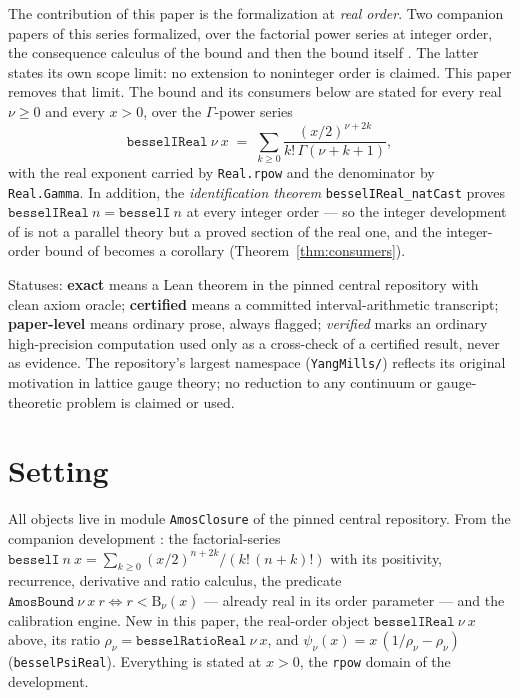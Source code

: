 \documentclass[11pt]{article}
\newcommand{\lean}[1]{\texttt{#1}}
\newcommand{\RHS}{\mathrm{B}}
\begin{document}
The contribution of this paper is the formalization at
\emph{real order}.  Two companion papers of this series formalized,
over the factorial power series at integer order, the consequence
calculus of the bound \cite{ErikssonC2} and then the bound itself
\cite{ErikssonC3}.  The latter states its own scope limit: no
extension to noninteger order is claimed.  This paper removes that
limit.  The bound and its consumers below are stated for every real
$\nu \ge 0$ and every $x > 0$, over the $\Gamma$-power series
\[
\lean{besselIReal}\ \nu\ x \;=\;
\sum_{k \ge 0} \frac{(x/2)^{\nu+2k}}{k!\,\Gamma(\nu+k+1)},
\]
with the real exponent carried by \lean{Real.rpow} and the
denominator by \lean{Real.Gamma}.  In addition, the
\emph{identification theorem} \lean{besselIReal\_natCast} proves
$\lean{besselIReal}\ n = \lean{besselI}\ n$ at every integer order
--- so the integer development of \cite{ErikssonC2,ErikssonC3} is
not a parallel theory but a proved section of the real one, and the
integer-order bound of \cite{ErikssonC3} becomes a corollary
(Theorem~\ref{thm:consumers}).

Statuses: \textbf{exact} means a Lean theorem in the pinned central
repository with clean axiom oracle; \textbf{certified} means a
committed interval-arithmetic transcript; \textbf{paper-level} means
ordinary prose, always flagged; \emph{verified} marks an ordinary
high-precision computation used only as a cross-check of a certified
result, never as evidence.  The repository's largest namespace
(\lean{YangMills/}) reflects its original motivation in lattice
gauge theory; no reduction to any continuum or gauge-theoretic
problem is claimed or used.

\section{Setting}\label{sec:setting}

All objects live in module \lean{AmosClosure} of the pinned central
repository.  From the companion development
\cite{ErikssonC2,ErikssonC3}: the factorial-series
$\lean{besselI}\ n\ x = \sum_{k\ge0}(x/2)^{n+2k}/(k!\,(n+k)!)$ with
its positivity, recurrence, derivative and ratio calculus, the
predicate $\lean{AmosBound}\ \nu\ x\ r \iff r < \RHS_\nu(x)$ ---
already real in its order parameter --- and the calibration
engine.  New in this paper, the real-order object
$\lean{besselIReal}\ \nu\ x$ above, its ratio
$\rho_\nu = \lean{besselRatioReal}\ \nu\ x$, and
$\psi_\nu(x) = x\,(1/\rho_\nu - \rho_\nu)$
(\lean{besselPsiReal}).  Everything is stated at $x > 0$, the
\lean{rpow} domain of the development.
\end{document}
